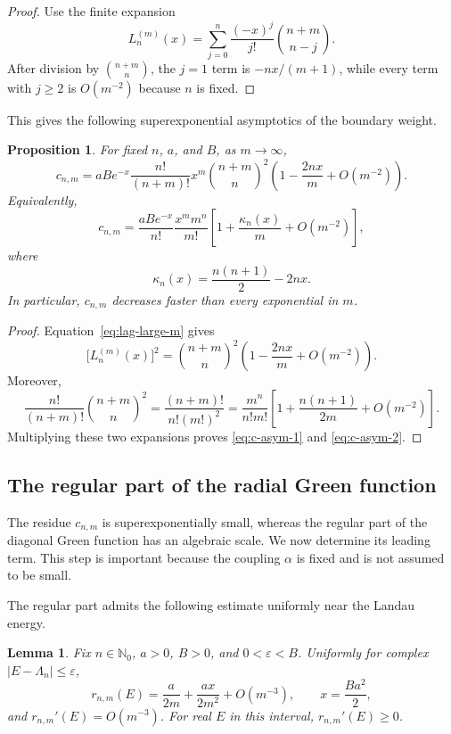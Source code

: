 \documentclass[12pt,a4paper]{article}
\numberwithin{equation}{section}
\newtheorem{prop}[thm]{Proposition}
\newtheorem{lem}[thm]{Lemma}
\theoremstyle{remark}
\theoremstyle{definition}
\newcommand{\N}{\mathbb N}
\begin{document}
\begin{proof}
Use the finite expansion
$$
L_n^{(m)}(x)
=\sum_{j=0}^n\frac{(-x)^j}{j!}
\binom{n+m}{n-j}.
$$
After division by $\binom{n+m}{n}$, the $j=1$ term is
$-nx/(m+1)$, while every term with $j\ge2$ is $O(m^{-2})$ because $n$ is fixed.
\end{proof}

This gives the following superexponential asymptotics of the boundary weight.

\begin{prop}\label{prop:c-asym}
For fixed $n$, $a$, and $B$, as $m\to\infty$,
\begin{equation}\label{eq:c-asym-1}
c_{n,m}
=aB e^{-x}\frac{n!}{(n+m)!}x^m
\binom{n+m}{n}^2
\left(1-\frac{2nx}{m}+O(m^{-2})\right).
\end{equation}
Equivalently,
\begin{equation}\label{eq:c-asym-2}
c_{n,m}
=\frac{aB e^{-x}}{n!}
\frac{x^m m^n}{m!}
\left[1+\frac{\kappa_n(x)}{m}+O(m^{-2})\right],
\end{equation}
where
\begin{equation}\label{eq:kappa}
\kappa_n(x)=\frac{n(n+1)}{2}-2nx.
\end{equation}
In particular, $c_{n,m}$ decreases faster than every exponential in $m$.
\end{prop}

\begin{proof}
Equation~\eqref{eq:lag-large-m} gives
$$
\bigl[L_n^{(m)}(x)\bigr]^2
=\binom{n+m}{n}^2
\left(1-\frac{2nx}{m}+O(m^{-2})\right).
$$
Moreover,
$$
\frac{n!}{(n+m)!}\binom{n+m}{n}^2
=\frac{(n+m)!}{n!(m!)^2}
=\frac{m^n}{n!m!}
\left[1+\frac{n(n+1)}{2m}+O(m^{-2})\right].
$$
Multiplying these two expansions proves \eqref{eq:c-asym-1} and
\eqref{eq:c-asym-2}.
\end{proof}

\subsection{The regular part of the radial Green function}

The residue $c_{n,m}$ is superexponentially small, whereas the regular part of
the diagonal Green function has an algebraic scale.  We now determine its
leading term.  This step is important because the coupling $\alpha$ is fixed
and is not assumed to be small.

The regular part admits the following estimate uniformly near the Landau energy.

\begin{lem}\label{lem:regular-part}
Fix $n\in\N_0$, $a>0$, $B>0$, and $0<\varepsilon<B$.
Uniformly for complex $|E-\Lambda_n|\le\varepsilon$,
\begin{equation}\label{eq:regular-estimate}
r_{n,m}(E)=\frac{a}{2m}+\frac{ax}{2m^2}+O(m^{-3}),
\qquad x=\frac{Ba^2}{2},
\end{equation}
and $r_{n,m}'(E)=O(m^{-3})$. For real $E$ in this interval,
$r_{n,m}'(E)\ge0$.
\end{lem}
\end{document}
